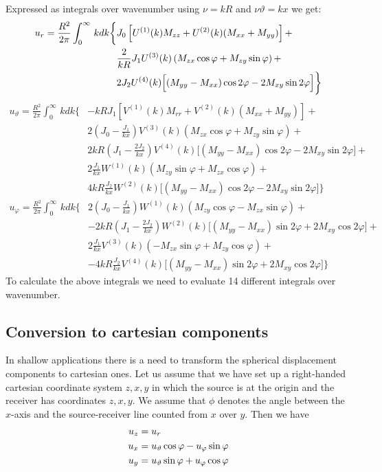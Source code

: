 \documentclass[12pt,a4paper]{article}
\begin{document}
Expressed as integrals over wavenumber using $\nu=kR$ and $\nu\vartheta=kx$ we get:
\begin{align}
u_r = \frac{R^2}{2\pi}\int_0^\infty\,k dk \bigg\{ & J_0\left[U^{(1)}(k) M_{zz}+U^{(2)}(k)(M_{xx}+M_{yy})\right] + \notag \\
& \frac{2}{kR}J_1 U^{(3)}(k) \left(M_{zx}\cos\varphi+M_{zy}\sin\varphi\right) + \nonumber \\
& 2 J_2 U^{(4)}(k) \Big[(M_{yy}-M_{xx})\cos 2\varphi - 2M_{xy}\sin 2\varphi\Big]\bigg\} \nonumber 
\end{align}
\begin{align}
u_\vartheta = \frac{R^2}{2\pi}\int_0^\infty\,k dk \bigg\{ & -kR J_1\left[V^{(1)}(k) M_{rr}+V^{(2)}(k) (M_{xx}+M_{yy})\right] + \nonumber \\
& 2\left(J_0-\frac{J_1}{kx}\right) V^{(3)}(k) \left(M_{zx}\cos\varphi+M_{zy}\sin\varphi\right) + \nonumber \\
& 2kR\left(J_1-\frac{2J_2}{kx}\right) V^{(4)}(k) \Big[(M_{yy}-M_{xx})\cos 2\varphi - 2M_{xy}\sin 2\varphi\Big] + \nonumber  \\
& 2 \frac{J_1}{kx} W^{(1)}(k) \left(M_{zy}\sin\varphi+M_{zx}\cos\varphi\right) + \nonumber  \\
& 4kR \frac{J_2}{kx} W^{(2)}(k) \Big[(M_{yy}-M_{xx})\cos 2\varphi - 2M_{xy}\sin 2\varphi\Big]\bigg\} \nonumber
\end{align}
\begin{align}
u_\varphi = \frac{R^2}{2\pi}\int_0^\infty\,k dk \bigg\{ & 2\left(J_0-\frac{J_1}{kx}\right) W^{(1)}(k) \left(M_{zy}\cos\varphi-M_{zx}\sin\varphi\right) + \nonumber \\
& -2kR\left(J_1-\frac{2J_2}{kx}\right) W^{(2)}(k) \Big[(M_{yy}-M_{xx})\sin 2\varphi + 2M_{xy}\cos 2\varphi\Big] + \nonumber  \\
& 2 \frac{J_1}{kx} V^{(3)}(k) \left(-M_{zx}\sin\varphi+M_{zy}\cos\varphi\right) + \nonumber \\
& -4kR \frac{J_2}{kx} V^{(4)}(k) \Big[(M_{yy}-M_{xx})\sin 2\varphi + 2M_{xy}\cos 2\varphi\Big]\bigg\} \nonumber
\end{align}
To calculate the above integrals we need to evaluate 14 different integrals over wavenumber.
%
\subsection{Conversion to cartesian components}
In shallow applications there is a need to transform the spherical displacement components to cartesian ones. Let us assume that we have set up a right-handed cartesian coordinate system $z,x,y$ in which the source is at the origin and the receiver has coordinates $z,x,y$. We assume that $\phi$ denotes the angle between the $x$-axis and the source-receiver line counted from $x$ over $y$. Then we have
\begin{align}
u_z & = u_r \notag \\
u_x & = u_\vartheta \cos\varphi-u_\varphi \sin\varphi \nonumber  \\
u_y & = u_\vartheta \sin\varphi + u_\varphi\cos\varphi \nonumber
\end{align}
\end{document}
